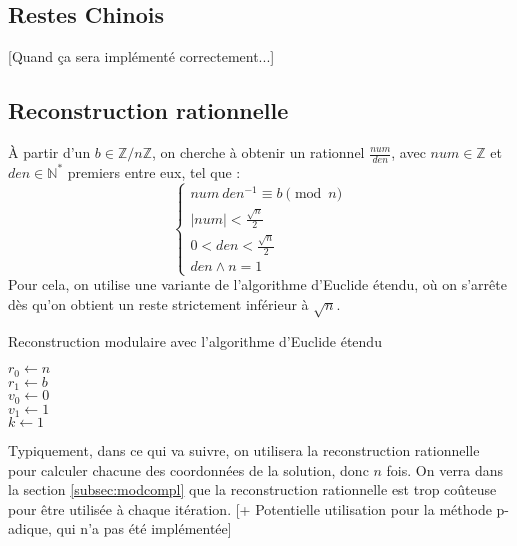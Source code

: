 \documentclass[french]{article}
\begin{document}
\subsection{Restes Chinois}
[Quand ça sera implémenté correctement...]
\subsection{Reconstruction rationnelle}
À partir d'un $b \in \mathbb{Z}/n\mathbb{Z}$, on cherche à obtenir un rationnel $\frac{num}{den}$, avec $num \in \mathbb{Z}$ et $den \in \mathbb{N}^*$ premiers entre eux, tel que :
\begin{equation*}
	\begin{cases}
		num \  den^{-1} \equiv b \pmod n\\
		\lvert num \rvert < \frac{\sqrt{n}}{2}\\
		0 < den < \frac{\sqrt{n}}{2}\\
		den \wedge n = 1
	\end{cases}
\end{equation*}
Pour cela, on utilise une variante de l'algorithme d'Euclide étendu, où on s'arrête dès qu'on obtient un reste strictement inférieur à $\sqrt{n}$.\newline\newline
\begin{algorithm}[H]
	\DontPrintSemicolon
	\caption{Reconstruction modulaire avec l'algorithme d'Euclide étendu}
	$r_0 \gets n$\\
	$r_1 \gets b$\\
	$v_0 \gets 0$\\
	$v_1 \gets 1$\\
	$k \gets 1$\\
\end{algorithm}
\leavevmode \newline
Typiquement, dans ce qui va suivre, on utilisera la reconstruction rationnelle pour calculer chacune des coordonnées de la solution, donc $n$ fois.
\newline
On verra dans la section \ref{subsec:modcompl} que la reconstruction rationnelle est trop coûteuse pour être utilisée à chaque itération. [+ Potentielle utilisation pour la méthode p-adique, qui n'a pas été implémentée]
\end{document}

